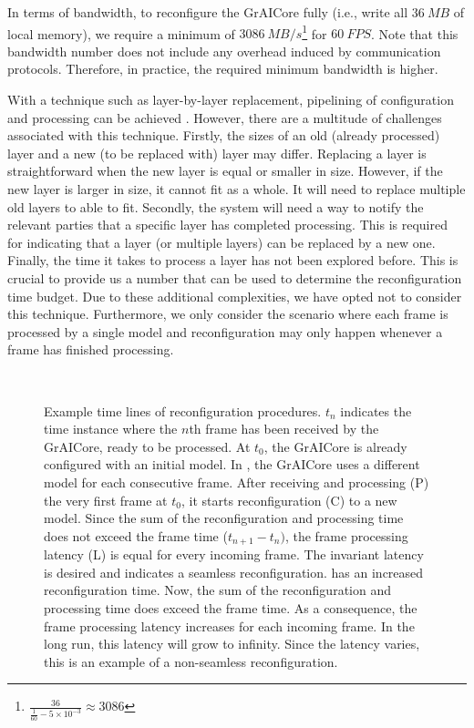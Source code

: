 In terms of bandwidth, to reconfigure the GrAICore fully (i.e., write all $\SI{36}{MB}$ of local memory), we require a minimum of $\SI{3086}{MB/s}$\footnote{$\frac{36}{\frac{1}{60} - 5 \times 10^{-3}} \approx 3086$} for $\SI{60}{FPS}$.
Note that this bandwidth number does not include any overhead induced by communication protocols. Therefore, in practice, the required minimum bandwidth is higher. 

With a technique such as layer-by-layer replacement, pipelining of configuration and processing can be achieved \cite{jiDemandLayeringRealTime2022}.
However, there are a multitude of challenges associated with this technique. 
Firstly, the sizes of an old (already processed) layer and a new (to be replaced with) layer may differ.
Replacing a layer is straightforward when the new layer is equal or smaller in size.
However, if the new layer is larger in size, it cannot fit as a whole.
It will need to replace multiple old layers to able to fit.
Secondly, the system will need a way to notify the relevant parties that a specific layer has completed processing.
This is required for indicating that a layer (or multiple layers) can be replaced by a new one. %
Finally, the time it takes to process a layer has not been explored before.
This is crucial to provide us a number that can be used to determine the reconfiguration time budget.
Due to these additional complexities, we have opted not to consider this technique.
Furthermore, we only consider the scenario where each frame is processed by a single model and reconfiguration may only happen whenever a frame has finished processing.

\begin{figure}[htbp]
    \centering
    \subfloat[]{
        
        \label{fig:correct_reconfig}
    } \\
    \subfloat[]{
        
        \label{fig:incorrect_reconfig}
    }
    \caption{
    Example time lines of reconfiguration procedures.
    $t_n$ indicates the time instance where the $n$th frame has been received by the GrAICore, ready to be processed.
    At $t_0$, the GrAICore is already configured with an initial model.
    In \protect{}, the GrAICore uses a different model for each consecutive frame.
    After receiving and processing (P) the very first frame at $t_0$, it starts reconfiguration (C) to a new model.
    Since the sum of the reconfiguration and processing time does not exceed the frame time ($t_{n+1} - t_{n})$, the frame processing latency (L) is equal for every incoming frame.
    The invariant latency is desired and indicates a seamless reconfiguration.
    \protect{} has an increased reconfiguration time.
    Now, the sum of the reconfiguration and processing time does exceed the frame time.
    As a consequence, the frame processing latency increases for each incoming frame.
    In the long run, this latency will grow to infinity.
    Since the latency varies, this is an example of a non-seamless reconfiguration.
    }
    \label{fig:reconfig_time_line_ex}
\end{figure}

